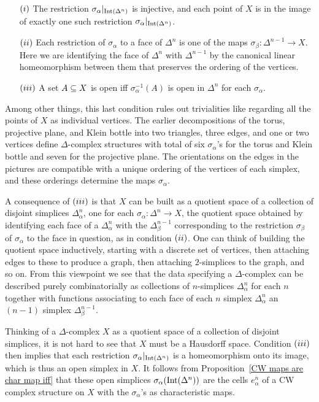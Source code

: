 \begin{itemize}
\item[$(\rmnum{1})$]The restriction $\sigma_\alpha|_{\mathrm{Int}(\Delta^n)}$ is injective, and each point of $X$ is in the image of exactly
one such restriction $\sigma_\alpha|_{\mathrm{Int}(\Delta^n)}$.
\item[$(\rmnum{2})$]Each restriction of $\sigma_\alpha$ to a face of $\Delta^n$ is one of the maps $\sigma_\beta:\Delta^{n-1}\to X$. Here we are identifying the face of $\Delta^n$ with $\Delta^{n-1}$ by the canonical linear homeomorphism between them that preserves the ordering of the vertices.
\item[$(\rmnum{3})$]A set $A\subseteq X$ is open iff $\sigma^{-1}_\alpha(A)$ is open in $\Delta^n$ for each $\sigma_\alpha$.
\end{itemize}
Among other things, this last condition rules out trivialities like regarding all the points of $X$ as individual vertices. The earlier decompositions of the torus, projective plane, and Klein bottle into two triangles, three edges, and one or two vertices define $\Delta$-complex structures with   total of six $\sigma_\alpha$'s for the torus and Klein bottle and seven for the projective plane. The orientations on the edges in the pictures are compatible with a unique ordering of the vertices of each simplex, and these orderings determine the maps $\sigma_\alpha$.\par
A consequence of $(\rmnum{3})$ is that $X$ can be built as a quotient space of a collection of disjoint simplices $\Delta^n_\alpha$, one for each $\sigma_\alpha:\Delta^n\to X$, the quotient space obtained by identifying each face of a $\Delta^n_\alpha$ with the $\Delta_\beta^{n-1}$ corresponding to the restriction $\sigma_\beta$ of $\sigma_\alpha$ to the face in question, as in condition $(\rmnum{2})$. One can think of building the quotient space inductively, starting with a discrete set of vertices, then attaching edges to
these to produce a graph, then attaching $2$-simplices to the graph, and so on. From this viewpoint we see that the data specifying a $\Delta$-complex can be described purely combinatorially as collections of $n$-simplices $\Delta^n_\alpha$ for each $n$ together with functions associating to each face of each $n$ simplex $\Delta^n_\alpha$ an $(n-1)$ simplex $\Delta^{n-1}_\beta$.\par
Thinking of a $\Delta$-complex $X$ as a quotient space of a collection of disjoint simplices, it is not hard to see that $X$ must be a Hausdorff space. Condition $(\rmnum{3})$ then implies that each restriction $\sigma_\alpha|_{\mathrm{Int}(\Delta^n)}$ is a homeomorphism onto its image, which is thus an open simplex in $X$. It follows from Proposition~\ref{CW maps are char map iff} that these open simplices $\sigma_\alpha(\mathrm{Int}(\Delta^n))$ are the cells $e^n_\alpha$ of a CW complex structure on $X$ with the $\sigma_\alpha$'s as characteristic maps.

